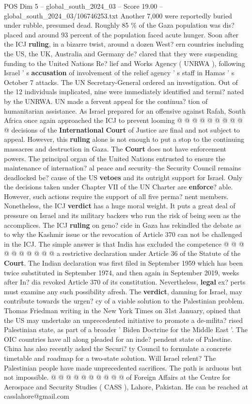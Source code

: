\begin{textsample}{POS Dim 5 – global\_south\_2024\_03 – Score 19.00 – global\_south\_2024\_03/106746253.txt}
Another 7,000 were reportedly buried under rubble, presumed dead.
Roughly 85 \% of the Gaza population was dis? placed and around 93 percent of the population faced acute hunger.
Soon after the ICJ \textbf{ruling}, in a bizarre twist, around a dozen West? ern countries including the US, the UK, Australia and Germany de? clared that they were suspending funding to the United Nations Re? lief and Works Agency ( UNRWA ), following Israel ' s \textbf{accusation} of involvement of the relief agency ' s staff in Hamas ' s October 7 attacks.
The UN Secretary-General ordered an investigation.
Out of the 12 individuals implicated, nine were immediately identified and termi? nated by the UNRWA.
UN made a fervent appeal for the continua? tion of humanitarian assistance.
As Israel prepared for an offensive against Rafah, South Africa once again approached the ICJ to prevent looming @ @ @ @ @ @ @ @ @ @ decisions of the \textbf{International} \textbf{Court} of Justice are final and not subject to appeal.
However, this \textbf{ruling} alone is not enough to put a stop to the continuing massacres and destruction in Gaza.
The \textbf{Court} does not have enforcement powers.
The principal organ of the United Nations entrusted to ensure the maintenance of internation? al peace and security--the Security Council remains deadlocked be? cause of the US \textbf{vetoes} and its outright support for Israel.
Only the decisions taken under Chapter VII of the UN Charter are \textbf{enforce}? able.
However, such actions require the support of all five perma? nent members.
Nonetheless, the ICJ \textbf{verdict} has a huge moral weight.
It puts a great deal of pressure on Israel and its military backers who run the risk of being seen as the accomplices.
The ICJ \textbf{ruling} on geno? cide in Gaza has rekindled the debate as to why the Kashmir issue or the revocation of Article 370 can not be challenged in the ICJ.
The simple answer is that India has excluded the competence @ @ @ @ @ @ @ @ @ @ a restrictive declaration under Article 36 of the Statute of the \textbf{Court}.
The Indian declaration was first filed in September 1959 which has been twice substituted in September 1974, and then again in September 2019, weeks after In? dia revoked Article 370 of its constitution.
Nevertheless, \textbf{legal} ex? perts must examine any such possibility afresh.
The \textbf{verdict}, damning for Israel, may contribute towards the urgen? cy of a viable solution to the Palestinian problem.
Thomas Friedman writing in the New York Times on 31st January, opined that the US may undertake an unprecedented initiative to promote a de-milita? rised Palestinian state, as part of a broader ' Biden Doctrine for the Middle East '.
The OIC countries have all along pleaded for an inde? pendent state of Palestine.
China has also recently asked the Securi? ty Council to formulate a concrete timetable and roadmap for a two-state solution.
Will Israel relent?
The Palestinian people have made unprecedented sacrifices.
The path is arduous but not impossible. @ @ @ @ @ @ @ @ @ @ of Foreign Affairs at the Centre for Aerospace and Security Studies ( CASS ), Lahore, Pakistan.
He can be reached at casslahore@gmail.com


\end{textsample}
